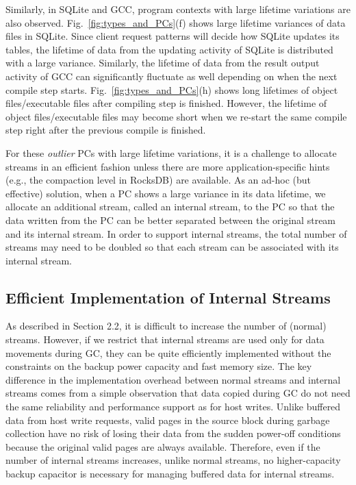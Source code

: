 Similarly, in SQLite and GCC, program contexts with large lifetime variations
are also observed.
Fig.~\ref{fig:types_and_PCs}(f) shows large lifetime variances of data files in
SQLite.
{\color{blue}
Since client request patterns will decide how SQLite updates its tables, 
the lifetime of data from the updating activity of SQLite is distributed 
with a large variance.  Similarly, the lifetime of
data from the result output activity of GCC can significantly fluctuate 
as well depending on when the next compile step starts.   
Fig.~\ref{fig:types_and_PCs}(h) shows long lifetimes of 
}
object files/executable files after compiling step is finished.
However, the lifetime of object files/executable files 
may become short when we re-start the same 
compile step right after 
the previous compile is finished.

{\color{blue}
For these {\it outlier} PCs with large lifetime variations, 
it is a challenge to allocate streams in an efficient fashion unless 
there are more application-specific hints (e.g., the compaction level in
RocksDB) are available.  
As an ad-hoc (but effective) solution, when a PC shows a large variance 
in its data lifetime, we allocate an additional stream, called an internal stream, 
to the PC so that
the data written from the PC can be better separated between the original 
stream and its internal stream.  
In order to support internal streams, the total number of streams may 
need to be doubled so
that each stream can be associated with its internal stream.
}


\subsection{Efficient Implementation of Internal Streams}
As described in Section 2.2, it is difficult to increase the number of 
(normal) streams.  However, 
if we restrict that internal streams are used only for data movements
during GC,
they can be quite efficiently
implemented without the constraints on the backup power capacity and fast memory size.  
The key difference in the implementation overhead between normal streams and 
internal streams comes from a simple observation that data copied during 
GC do not need the same reliability and performance support as for host writes.  
Unlike buffered data from host write requests, valid pages in
the source block during garbage collection have no risk of losing their data 
from the sudden power-off conditions because the original valid pages are always available.    
Therefore, even if the
number of internal streams increases, unlike normal streams, 
no higher-capacity backup capacitor is necessary for managing buffered data for internal streams. 

